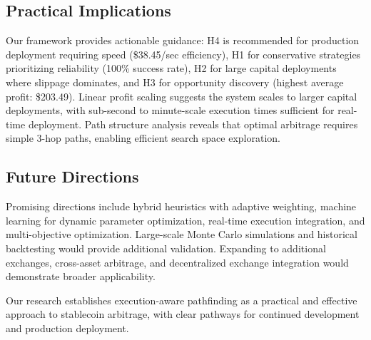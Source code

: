 \subsection{Practical Implications}

Our framework provides actionable guidance: H4 is recommended for production deployment requiring speed (\$38.45/sec efficiency), H1 for conservative strategies prioritizing reliability (100\% success rate), H2 for large capital deployments where slippage dominates, and H3 for opportunity discovery (highest average profit: \$203.49). Linear profit scaling suggests the system scales to larger capital deployments, with sub-second to minute-scale execution times sufficient for real-time deployment. Path structure analysis reveals that optimal arbitrage requires simple 3-hop paths, enabling efficient search space exploration.

\subsection{Future Directions}

Promising directions include hybrid heuristics with adaptive weighting, machine learning for dynamic parameter optimization, real-time execution integration, and multi-objective optimization. Large-scale Monte Carlo simulations and historical backtesting would provide additional validation. Expanding to additional exchanges, cross-asset arbitrage, and decentralized exchange integration would demonstrate broader applicability.

Our research establishes execution-aware pathfinding as a practical and effective approach to stablecoin arbitrage, with clear pathways for continued development and production deployment.



